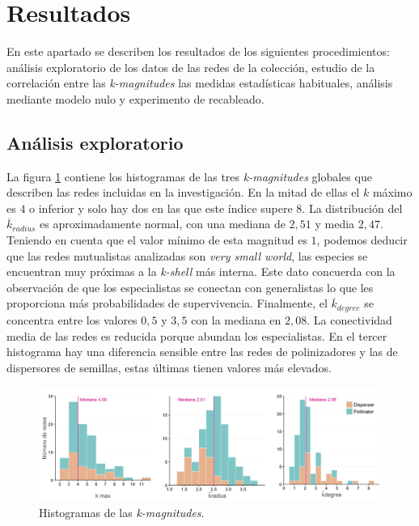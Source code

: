 \clearpage
\section{Resultados}

En este apartado se describen los resultados de los siguientes procedimientos: análisis exploratorio de los datos de las redes de la colección, estudio de la correlación entre las \textit{k-magnitudes} las medidas estadísticas habituales, análisis mediante modelo nulo y experimento de recableado.

\subsection{Análisis exploratorio}

La figura \ref{fig:ESTATICA_hist_kmagnitudes} contiene los histogramas de las tres \textit{k-magnitudes} globales que describen las redes incluidas en la investigación. En la mitad de ellas el $k$ máximo es $4$ o inferior y solo hay dos en las que este índice supere $8$. La distribución del $\overline{k}_{radius}$ es aproximadamente normal, con una mediana de $2,51$ y media $2,47$. Teniendo en cuenta que el valor mínimo de esta magnitud es $1$, podemos deducir que las redes mutualistas analizadas son \textit{very small world}, las especies se encuentran muy próximas a la \textit{k-shell} más interna. Este dato concuerda con la observación de que los especialistas se conectan con generalistas lo que les proporciona más probabilidades de supervivencia. Finalmente, el $\overline{k}_{degree}$ se
concentra entre los valores $0,5$ y $3,5$ con la mediana en $2,08$. La conectividad media de las redes es reducida
porque abundan los especialistas. En el tercer histograma hay una diferencia sensible entre las redes de polinizadores
y las de dispersores de semillas, estas últimas tienen valores más elevados.

\begin{figure}[h!]
\centering
\includegraphics[scale=0.5]{Figures/ESTATICA_hist_kmagnitudes.png}
\caption{Histogramas de las \textit{k-magnitudes}.}
\label{fig:ESTATICA_hist_kmagnitudes}
\end{figure}

